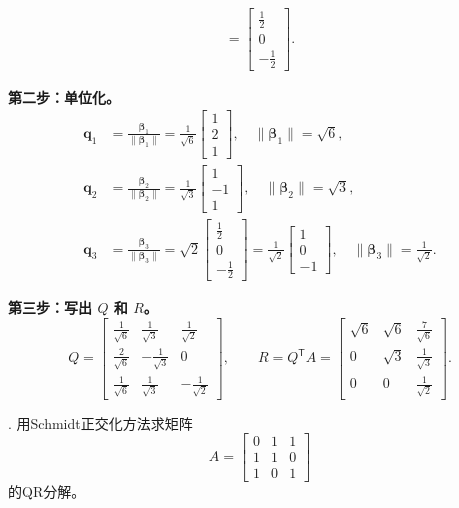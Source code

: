 \documentclass{article}
\begin{document}
\begin{align*}
= \begin{bmatrix}\frac12\\[2pt]0\\[2pt]-\frac12\end{bmatrix}.
\end{align*}

\textbf{第二步：单位化。}
\begin{align*}
\bm{q}_1 &= \frac{\bm{\beta}_1}{\|\bm{\beta}_1\|} = \frac{1}{\sqrt{6}}\begin{bmatrix}1\\2\\1\end{bmatrix},
\quad \|\bm{\beta}_1\|=\sqrt{6},\\[4pt]
\bm{q}_2 &= \frac{\bm{\beta}_2}{\|\bm{\beta}_2\|} = \frac{1}{\sqrt{3}}\begin{bmatrix}1\\-1\\1\end{bmatrix},
\quad \|\bm{\beta}_2\|=\sqrt{3},\\[4pt]
\bm{q}_3 &= \frac{\bm{\beta}_3}{\|\bm{\beta}_3\|} = \sqrt{2}\begin{bmatrix}\frac12\\[2pt]0\\[2pt]-\frac12\end{bmatrix}
= \frac{1}{\sqrt{2}}\begin{bmatrix}1\\0\\-1\end{bmatrix},\quad \|\bm{\beta}_3\|=\frac{1}{\sqrt{2}}.
\end{align*}

\textbf{第三步：写出 $Q$ 和 $R$。}
\[
Q = \begin{bmatrix}
\frac{1}{\sqrt{6}} & \frac{1}{\sqrt{3}} & \frac{1}{\sqrt{2}}\\[4pt]
\frac{2}{\sqrt{6}} & -\frac{1}{\sqrt{3}} & 0\\[4pt]
\frac{1}{\sqrt{6}} & \frac{1}{\sqrt{3}} & -\frac{1}{\sqrt{2}}
\end{bmatrix},\qquad
R = Q^{\mathsf T}A = \begin{bmatrix}
\sqrt{6} & \sqrt{6} & \frac{7}{\sqrt{6}}\\[4pt]
0 & \sqrt{3} & \frac{1}{\sqrt{3}}\\[4pt]
0 & 0 & \frac{1}{\sqrt{2}}
\end{bmatrix}.
\]
\newpage

. 用Schmidt正交化方法求矩阵
\[
A=\begin{bmatrix}
0 & 1 & 1 \\
1 & 1 & 0 \\
1 & 0 & 1
\end{bmatrix}
\]
的QR分解。
\end{document}
